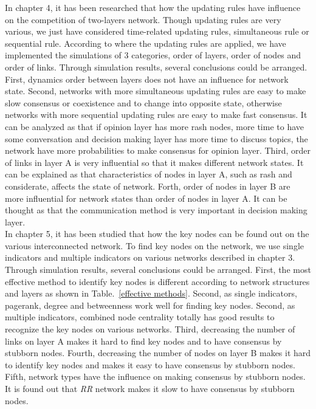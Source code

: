 In chapter 4, it has been researched that how the updating rules have influence on the competition of two-layers network. Though updating rules are very various, we just have considered time-related updating rules, simultaneous rule or sequential rule. According to where the updating rules are applied, we have implemented the simulations of 3 categories, order of layers, order of nodes and order of links. Through simulation results, several conclusions could be arranged. First, dynamics order between layers does not have an influence for network state. Second, networks with more simultaneous updating rules are easy to make slow consensus or coexistence and to change into opposite state, otherwise networks with more sequential updating rules are easy to make fast consensus. It can be analyzed as that if opinion layer has more rash nodes, more time to have some conversation and decision making layer has more time to  discuss topics, the network have more probabilities to make consensus for opinion layer. Third, order of links in layer A is very influential so that it makes different network states. It can be explained as that characteristics of nodes in layer A, such as rash and considerate, affects the state of network. Forth, order of nodes in layer B are more influential for network states than order of nodes in layer A. It can be thought as that the communication method is very important in decision making layer. \\

In chapter 5, it has been studied that how the key nodes can be found out on the various interconnected network. To find key nodes on the network, we use single indicators and multiple indicators on various networks described in chapter 3. Through simulation results, several conclusions could be arranged.
First, the most effective method to identify key nodes is different according to network structures and layers as shown in Table.~\ref{effective methods}. Second, as single indicators, pagerank, degree and betweenness work well for finding key nodes. Second, as multiple indicators, combined node centrality totally has good results to recognize the key nodes on various networks. Third, decreasing the number of links on layer A makes it hard to find key nodes and to have consensus by stubborn nodes.  Fourth, decreasing the number of nodes on layer B makes it hard to identify key nodes and makes it easy to have consensus by stubborn nodes. Fifth, network types have the influence on making consensus by stubborn nodes. It is found out that \textit{RR} network makes it slow to have consensus by stubborn nodes. 
  
